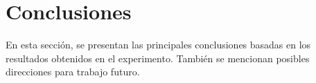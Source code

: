 \chapter{Conclusiones}

En esta sección, se presentan las principales conclusiones basadas en los resultados obtenidos en el experimento. También se mencionan posibles direcciones para trabajo futuro.

